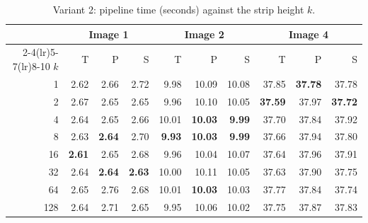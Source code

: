 \documentclass[11pt,a4paper]{article}
\begin{document}
\begin{table}[htbp]
\centering
\caption{Variant 2: pipeline time (seconds) against the strip height $k$.}
\label{tab:k-v2}
\begin{tabular}{r rrr rrr rrr}
\toprule
& \multicolumn{3}{c}{Image 1} & \multicolumn{3}{c}{Image 2} & \multicolumn{3}{c}{Image 4} \\
\cmidrule(lr){2-4}\cmidrule(lr){5-7}\cmidrule(lr){8-10}
$k$ & T & P & S & T & P & S & T & P & S \\
\midrule
1 & 2.62 & 2.66 & 2.72 & 9.98 & 10.09 & 10.08 & 37.85 & \textbf{37.78} & 37.78 \\
2 & 2.67 & 2.65 & 2.65 & 9.96 & 10.10 & 10.05 & \textbf{37.59} & 37.97 & \textbf{37.72} \\
4 & 2.64 & 2.65 & 2.66 & 10.01 & \textbf{10.03} & \textbf{9.99} & 37.70 & 37.84 & 37.92 \\
8 & 2.63 & \textbf{2.64} & 2.70 & \textbf{9.93} & \textbf{10.03} & \textbf{9.99} & 37.66 & 37.94 & 37.80 \\
16 & \textbf{2.61} & 2.65 & 2.68 & 9.96 & 10.04 & 10.07 & 37.64 & 37.96 & 37.91 \\
32 & 2.64 & \textbf{2.64} & \textbf{2.63} & 10.00 & 10.11 & 10.05 & 37.63 & 37.90 & 37.75 \\
64 & 2.65 & 2.76 & 2.68 & 10.01 & \textbf{10.03} & 10.03 & 37.77 & 37.84 & 37.74 \\
128 & 2.64 & 2.71 & 2.65 & 9.95 & 10.06 & 10.02 & 37.75 & 37.87 & 37.83 \\
\bottomrule
\end{tabular}
\end{table}
\end{document}
